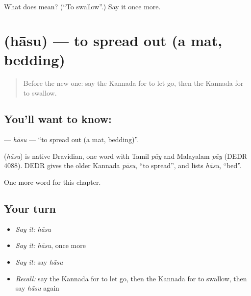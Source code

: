 \begin{tcolorbox}[breakable,colback=teal!4,colframe=teal!35!black,title={Before you move on}]
What does  mean? (\textquotedblleft{}To swallow\textquotedblright{}.) Say it once more.
\end{tcolorbox}
\section[\texorpdfstring{\kn{ಹಾಸು} (hāsu)}{ಹಾಸು (hāsu)}]{ (hāsu) — to spread out (a mat, bedding)}

\label{lesson:KA-C199-hasu}



\begin{quote}
Before the new one: say the Kannada for to let go, then the Kannada for to swallow.
\end{quote}

\subsection*{You'll want to know: }
\textbf{} — \emph{hāsu} — \textquotedblleft{}to spread out (a mat, bedding)\textquotedblright{}.

\begin{cousinweb}
\textbf{} (\emph{hāsu}) is native Dravidian, one word with Tamil \emph{pāy} and Malayalam \emph{pāy} (DEDR 4088). DEDR gives the older Kannada \emph{pāsu}, \textquotedblleft{}to spread\textquotedblright{}, and lists \emph{hāsu}, \textquotedblleft{}bed\textquotedblright{}.
\end{cousinweb}

\begin{grammarlens}[title={What you've built}]
One more word for this chapter.
\end{grammarlens}

\subsection*{Your turn}
\begin{itemize}
\raggedright
  \item \emph{Say it:} \emph{hāsu}
  \item \emph{Say it:} \emph{hāsu}, once more
  \item \emph{Say it:} say \emph{hāsu}
  \item \emph{Recall:} say the Kannada for to let go, then the Kannada for to swallow, then say \emph{hāsu} again
\end{itemize}

